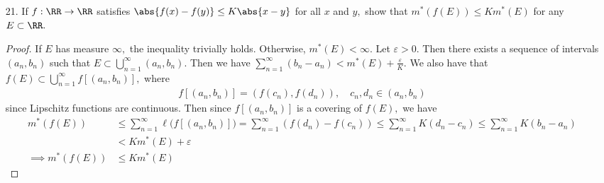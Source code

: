 \documentclass{article}
\begin{document}
\begin{itemize}
\begin{proof}
			Similarly, we have
			\begin{align*}
				m^*(A) &\le m^*(A\setminus E) + m^*(E) = m^*(A\setminus E) \\
				A\setminus E \subset A &\implies m^*(A\setminus E) \le m^*(A) \\
				\implies m^*(A) &= m^*(A\setminus E)
			\end{align*}
		\end{proof}

	\item[21.] If $f:\RR\to\RR$ satisfies $\abs{f(x)-f(y)}\le K\abs{x-y}$ for all $x$ and $y,$ show that $m^*(f(E))\le Km^*(E)$ for any $E\subset \RR.$
		\begin{proof}
			If $E$ has measure $\infty,$ the inequality trivially holds. Otherwise, $m^*(E)<\infty.$ Let $\varepsilon>0.$ Then there exists a sequence of intervals $(a_n, b_n)$ such that $E\subset \bigcup_{n=1}^\infty (a_n, b_n).$ Then we have $\sum_{n=1}^{\infty} (b_n-a_n) < m^*(E) + \frac{\varepsilon}{K}.$ We also have that $f(E) \subset \bigcup_{n=1}^\infty f\left[ (a_n, b_n) \right],$ where
			\begin{align*}
				f[(a_n, b_n)] = (f(c_n), f(d_n)), \quad c_n, d_n\in (a_n, b_n)
			\end{align*}
			since Lipschitz functions are continuous. Then since $f[(a_n, b_n)]$ is a covering of $f(E),$ we have
			\begin{align*}
				m^*(f(E)) &\le \sum_{n=1}^{\infty}\ell\bigg(f[(a_n, b_n)]\bigg) = \sum_{n=1}^{\infty} (f(d_n)-f(c_n))\le \sum_{n=1}^{\infty} K(d_n-c_n)\le \sum_{n=1}^{\infty} K(b_n-a_n) \\
				&< Km^*(E) + \varepsilon \\ 
				\implies m^*(f(E)) &\le Km^*(E)
			\end{align*}
		\end{proof}

\end{itemize}
\end{document}
